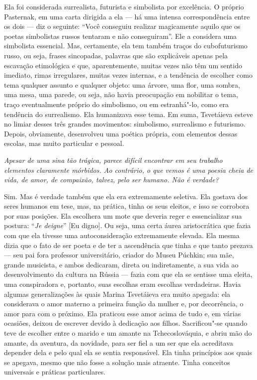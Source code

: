 Ela foi considerada surrealista, futurista e simbolista
por excelência. O próprio Pasternak, em uma carta dirigida a ela --- há
uma intensa correspondência entre os dois --- diz o seguinte: ``Você
conseguiu realizar magicamente aquilo que os poetas simbolistas russos
tentaram e não conseguiram''. Ele a considera uma simbolista essencial.
Mas, certamente, ela tem também traços do cubofuturismo russo, ou seja,
frases sincopadas, palavras que são explicáveis apenas pela escavação
etimológica e que, aparentemente, muitas vezes não têm um sentido
imediato, rimas irregulares, muitas vezes internas, e a tendência de
escolher como tema qualquer assunto e qualquer objeto: uma árvore, uma
flor, uma sombra, uma mesa, uma parede, ou seja, não havia preocupação
em nobilitar o tema, traço eventualmente próprio do simbolismo, ou em
estranhá"-lo, como era tendência do surrealismo. Ela humanizava esse
tema. Em suma, Tsvetáieva esteve no limiar desses três grandes
movimentos: simbolismo, surrealismo e futurismo. Depois, obviamente,
desenvolveu uma poética própria, com elementos dessas escolas, mas muito
particular e pessoal.

\medskip

\emph{Apesar de uma sina tão trágica, parece difícil encontrar em
seu trabalho elementos claramente mórbidos. Ao contrário, o que vemos é
uma poesia cheia de vida, de amor, de compaixão, talvez, pelo ser
humano. Não é verdade?}

Sim. Mas é verdade também que ela era extremamente
seletiva. Ela gostava dos seres humanos em tese, mas, na prática, tinha
os seus eleitos, e isso se corrobora por suas posições. Ela escolhera um
mote que deveria reger e essencializar sua postura: ``\emph{Je deigne}'' [Eu digno]. Ou
seja, uma certa áurea aristocrática que fazia com que ela tivesse uma
autoconsideração extremamente elevada. Ela mesma dizia que o fato de
ser poeta e de ter a ascendência que tinha e que tanto prezava --- seu
pai fora professor universitário, criador do Museu Púchkin; sua mãe,
grande musicista, e ambos dedicaram, direta ou indiretamente, a sua vida
ao desenvolvimento da cultura na Rússia --- fazia com que ela se
sentisse uma eleita, uma conspiradora e, portanto, suas escolhas eram
escolhas verdadeiras. Havia algumas generalizações às quais Marina
Tsvetáieva era muito apegada: ela considerava o amor materno a primeira
função da mulher e, por decorrência, o amor para com o próximo. Ela
praticou esse amor acima de tudo e, em várias ocasiões, deixou de
escrever devido à dedicação aos filhos. Sacrificou"-se quando teve de
escolher entre o marido e um amante na Tchecoslováquia, e abriu mão do
amante, da aventura, da novidade, para ser fiel a um ser que ela
acreditava depender dela e pelo qual ela se sentia responsável. Ela
tinha princípios aos quais se apegava, mesmo que não fosse a solução
mais atraente. Tinha conceitos universais e práticas particulares.

